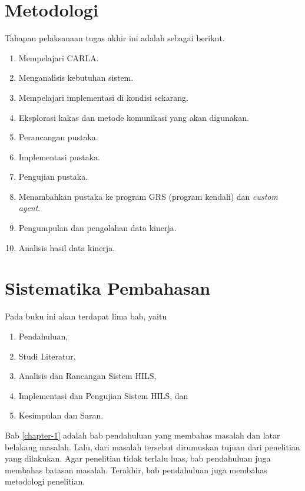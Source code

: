 \section{Metodologi}


Tahapan pelaksanaan tugas akhir ini adalah sebagai berikut.

\begin{enumerate}
	\item Mempelajari CARLA.
	\item Menganalisis kebutuhan sistem.
	\item Mempelajari implementasi di kondisi sekarang.
	\item Eksplorasi kakas dan metode komunikasi yang akan digunakan.
	\item Perancangan pustaka.
	\item Implementasi pustaka.
	\item Pengujian pustaka.
	\item Menambahkan pustaka ke program GRS (program kendali) dan
	      \textit{custom agent}.
	\item Pengumpulan dan pengolahan data kinerja.
	\item Analisis hasil data kinerja.
\end{enumerate}

\section{Sistematika Pembahasan}


Pada buku ini akan terdapat lima bab, yaitu
\begin{enumerate}
	\item Pendahuluan,
	\item Studi Literatur,
	\item Analisis dan Rancangan Sistem HILS,
	\item Implementasi dan Pengujian Sistem HILS, dan
	\item Kesimpulan dan Saran.
\end{enumerate}

Bab \ref{chapter-1} adalah bab pendahuluan yang membahas masalah dan latar belakang
masalah. Lalu, dari masalah tersebut dirumuskan tujuan dari penelitian yang
dilakukan. Agar penelitian tidak terlalu luas, bab pendahuluan juga membahas
batasan masalah. Terakhir, bab pendahuluan juga membahas metodologi penelitian.


